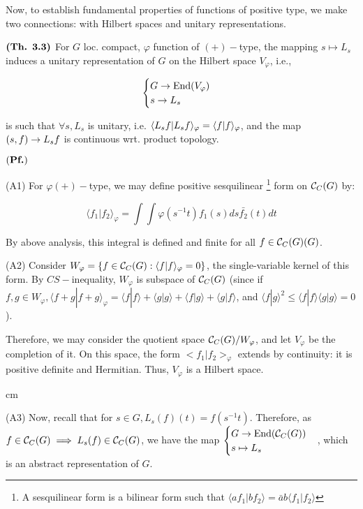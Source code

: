\documentclass{article}
\begin{document}
Now, to establish fundamental properties of functions of positive type, we make two connections: with Hilbert spaces and unitary representations.

$\textbf{(Th. 3.3)}$ For $G$ loc. compact, $\varphi$ function of $(+)-$type, the mapping $s \mapsto L_s$ induces a unitary representation of $G$ on the Hilbert space $V_{\varphi}$, i.e.,

$$\begin{cases}
G \ra \text{End}(V_{\varphi}) \\
s \ra L_s

\end{cases}$$

is such that $\forall s, L_s$ is unitary, i.e. $\langle L_sf | L_sf \rangle_{\varphi} = \langle f | f \rangle_{\varphi}$, and the map $(s,f) \rightarrow L_sf$ is continuous wrt. product topology.

$(\textbf{Pf.})$

(A1) For $\varphi (+)-$type, we may define positive sesquilinear \footnote{A sesquilinear form is a bilinear form such that $\langle a f_1|bf_2\rangle=\bar{a}b\langle f_1|f_2\rangle$} form on $\mathcal{C}_C(G)$ by:

$$\langle f_1|f_2\rangle_{\varphi} = \int \int \varphi(s^{-1}t)f_1(s) ds \bar{f_2}(t)dt$$

By above analysis, this integral is defined and finite for all $f \in \mathcal{C}_C(G)(G)$. 

(A2) Consider $W_{\varphi}=\{f \in \mathcal{C}_C(G): \langle f|f\rangle_{\varphi}=0\}$, the single-variable kernel of this form. By $CS-$inequality, $W_{\varphi}$ is subspace of $\mathcal{C}_C(G)$ (since if $f,g \in W_{\varphi}, \langle f+g|f+g\rangle_{\varphi} = \langle f|f\rangle + \langle g|g\rangle + \langle f|g\rangle + \langle g|f\rangle$, and $\langle f|g\rangle^2 \leq \langle f|f\rangle \langle g|g\rangle = 0$). 

Therefore, we may consider the quotient space $\mathcal{C}_C(G)/W_{\varphi}$, and let $V_{\varphi}$ be the completion of it. On this space, the form $<f_1|f_2>_{\varphi}$ extends by continuity: it is positive definite and Hermitian. Thus, $V_{\varphi}$ is a Hilbert space.

 cm

(A3) Now, recall that for $s \in G, L_s(f)(t) = f(s^{-1}t)$. Therefore, as $f \in \mathcal{C}_C(G) \implies L_s(f) \in \mathcal{C}_C(G)$, we have the map $\begin{cases} 
G \rightarrow \text{End}(\mathcal{C}_C(G)) \\
s \mapsto L_s \end{cases}$, which is an abstract representation of $G$.
\end{document}
